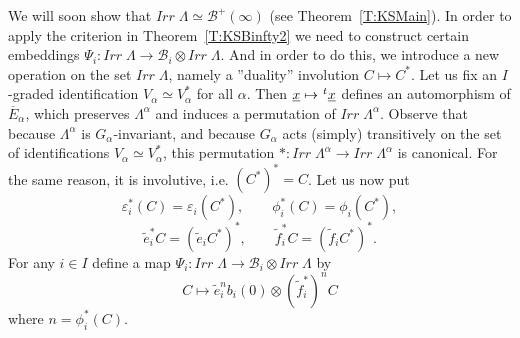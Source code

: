 \documentclass[a4paper,10pt]{amsart}
\def\a{\alpha}
\numberwithin{equation}{section}
\begin{document}
We will soon show that $Irr\;\Lambda \simeq \mathcal{B}^+(\infty)$ (see Theorem~\ref{T:KSMain}). In order to apply the criterion in Theorem~\ref{T:KSBinfty2} we need to construct certain embeddings $\Psi_i :Irr\;\Lambda \to \mathcal{B}_i \otimes Irr\;\Lambda $. And in order to do this, we introduce a new operation on the set $Irr\;\Lambda$, namely a ''duality'' involution $C \mapsto C^*$. Let us fix an $I$-graded identification $V_{\a} \simeq V_{\a}^*$ for all $\a$. Then $\underline{x} \mapsto \hspace{.01in}^t\underline{x}$ defines an automorphism of $\overline{E}_{\a}$, which preserves $\Lambda^{\a}$ and induces a permutation of $Irr\;\Lambda^{\a}$. Observe that because $\Lambda^{\a}$ is $G_{\a}$-invariant, and because $G_{\a}$ acts (simply) transitively on the set of identifications $V_{\a} \simeq V_{\a}^*$, this permutation $*: Irr\;\Lambda^{\a} \to Irr\;\Lambda^{\a}$ is canonical. For the same reason, it is involutive, i.e. $(C^*)^* =C$. Let us now put
$$\varepsilon_i^*(C)= \varepsilon_i(C^*), \qquad \phi^*_i(C)= \phi_i(C^*),$$
$$\tilde{e}_i^*C= (\tilde{e}_iC^*)^*, \qquad \tilde{f}_i^*C= (\tilde{f}_iC^*)^*.$$
For any $i \in I$ define  a map $\Psi_i: Irr\;\Lambda \to \mathcal{B}_i \otimes Irr\;\Lambda $ by
$$C \mapsto  \tilde{e}_i^n b_i(0) \otimes (\tilde{f}_i^*)^nC$$
where $n=\phi^*_i(C)$.

\vspace{.1in}
\end{document}
